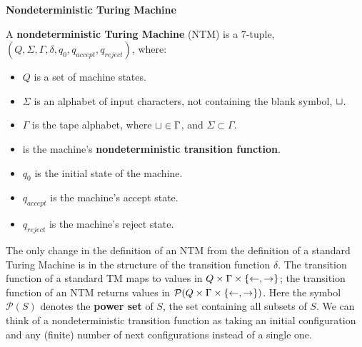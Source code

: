 \begin{definition}{\textbf{Nondeterministic Turing Machine}}
  
  A \textbf{nondeterministic Turing Machine} (NTM) is a 7-tuple, $(Q,
  \Sigma, \Gamma, \delta, q_0, q_{accept}, q_{reject})$, where:
  
  \begin{itemize}
  \item $Q$ is a set of machine states.
  \item $\Sigma$ is an alphabet of input characters, not containing
    the blank symbol, $\sqcup$.
  \item $\Gamma$ is the tape alphabet, where $\sqcup \in \Gamma$, and
    $\Sigma \subset \Gamma$.
  \item {} is the machine's
    \textbf{nondeterministic transition function}.
  \item $q_0$ is the initial state of the machine.
  \item $q_{accept}$ is the machine's accept state.
  \item $q_{reject}$ is the machine's reject state.
  \end{itemize}
  
\end{definition}

The only change in the definition of an NTM from the definition of a
standard Turing Machine is in the structure of the transition function
$\delta$.  The transition function of a standard TM maps to values in
$Q \times \Gamma \times \{\leftarrow, \rightarrow\}$; the transition
function of an NTM returns values in $\mathcal{P}(Q \times \Gamma \times
  \{\leftarrow, \rightarrow\})$.  Here the symbol $\mathcal{P}(S)$
denotes the \textbf{power set} of $S$, the set containing all subsets
of $S$.  We can think of a nondeterministic transition function as
taking an initial configuration and any (finite) number of next
configurations instead of a single one.\\

